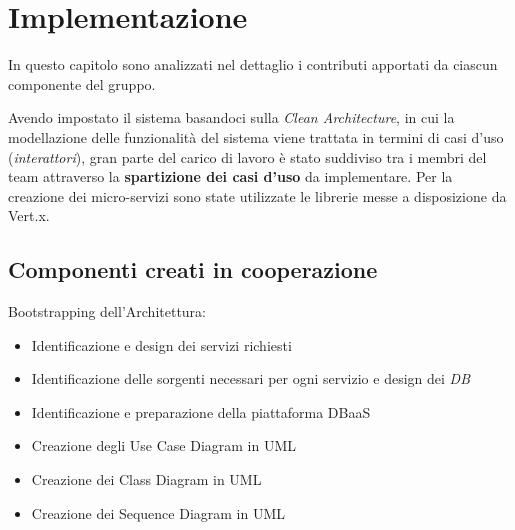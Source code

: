 \chapter{Implementazione}

In questo capitolo sono analizzati nel dettaglio i contributi apportati da ciascun componente del gruppo.

Avendo impostato il sistema basandoci sulla \textit{Clean Architecture}, in cui la modellazione delle funzionalità del sistema viene trattata in termini di casi d'uso (\textit{interattori}), gran parte del carico di lavoro è stato suddiviso tra i membri del team attraverso la  \textbf{spartizione dei casi d'uso} da implementare.
Per la creazione dei micro-servizi sono state utilizzate le librerie messe a disposizione da Vert.x. 

\section{Componenti creati in cooperazione}

Bootstrapping dell'Architettura:

\begin{itemize}
    \item Identificazione e design dei servizi richiesti
    \item Identificazione delle sorgenti necessari per ogni servizio e design dei \textit{DB}
    \item Identificazione e preparazione della piattaforma DBaaS 
    \item Creazione degli Use Case Diagram in UML
    \item Creazione dei Class Diagram in UML
    \item Creazione dei Sequence Diagram in UML
\end{itemize}

